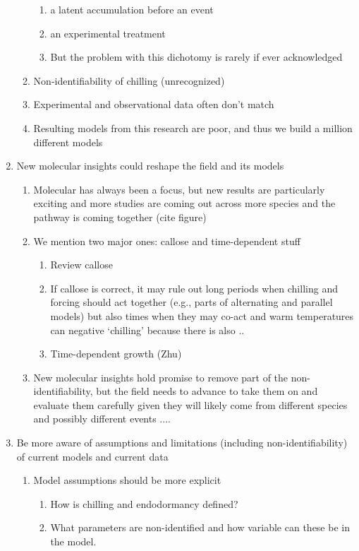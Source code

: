 \documentclass[11pt,letter]{article}
\begin{document}
\begin{enumerate}
\begin{enumerate}
\begin{enumerate}
\item a latent accumulation before an event
\item an experimental treatment
\item But the problem with this dichotomy is rarely if ever acknowledged
\end{enumerate}
\item Non-identifiability of chilling (unrecognized)
\item Experimental and observational data often don't match
\item Resulting models from this research are poor, and thus we build a million different models
\end{enumerate}
\item New molecular insights could reshape the field and its models 
\begin{enumerate}
\item Molecular has always been a focus, but new results are particularly exciting and more studies are coming out across more species and the pathway is coming together (cite figure)
\item We mention two major ones: callose and time-dependent stuff
\begin{enumerate}
\item Review callose
\item If callose is correct, it may rule out long periods when chilling and forcing should act together (e.g., parts of alternating and parallel models) but also times when they may co-act and warm temperatures can negative `chilling' because there is also .. 
\item Time-dependent growth (Zhu)
\end{enumerate}
\item New molecular insights hold promise to remove part of the non-identifiability, but the field needs to advance to take them on and evaluate them carefully given they will likely come from different species and possibly different events ....
\end{enumerate}
\item Be more aware of assumptions and limitations (including non-identifiability) of current models and current data
\begin{enumerate}
\item Model assumptions should be more explicit
\begin{enumerate}
\item How is chilling and endodormancy defined? 
\item What parameters are non-identified and how variable can these be in the model.

\end{enumerate}
\end{enumerate}
\end{enumerate}
\end{document}
